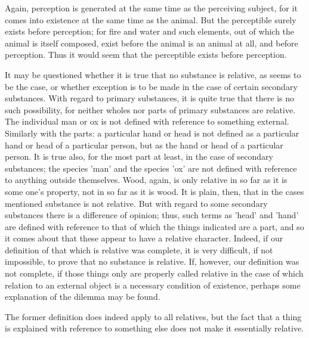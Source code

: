 Again, perception is generated at the same time as the perceiving
subject, for it comes into existence at the same time as the animal.
But the perceptible surely exists before perception; for fire and water
and such elements, out of which the animal is itself composed, exist
before the animal is an animal at all, and before perception. Thus it
would seem that the perceptible exists before perception.

It may be questioned whether it is true that no substance is relative,
as seems to be the case, or whether exception is to be made in the case
of certain secondary substances. With regard to primary substances, it
is quite true that there is no such possibility, for neither wholes nor
parts of primary substances are relative. The individual man or ox is
not defined with reference to something external. Similarly with the
parts: a particular hand or head is not defined as a particular hand or
head of a particular person, but as the hand or head of a particular
person. It is true also, for the most part at least, in the case of
secondary substances; the species 'man' and the species 'ox' are not
defined with reference to anything outside themselves. Wood, again, is
only relative in so far as it is some one's property, not in so far as
it is wood. It is plain, then, that in the cases mentioned substance is
not relative. But with regard to some secondary substances there is a
difference of opinion; thus, such terms as 'head' and 'hand' are
defined with reference to that of which the things indicated are a
part, and so it comes about that these appear to have a relative
character. Indeed, if our definition of that which is relative was
complete, it is very difficult, if not impossible, to prove that no
substance is relative. If, however, our definition was not complete, if
those things only are properly called relative in the case of which
relation to an external object is a necessary condition of existence,
perhaps some explanation of the dilemma may be found.

The former definition does indeed apply to all relatives, but the fact
that a thing is explained with reference to something else does not
make it essentially relative.

